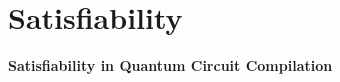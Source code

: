 \section{Satisfiability}


\begin{frame}[noframenumbering]
	
\vfill
\centering

\vspace{-.5cm}\textbf{\Large Satisfiability in Quantum Circuit Compilation}\vspace{-.5cm}

\vfill

\centering

\end{frame}



